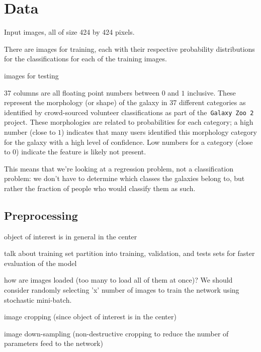 \section{Data}

Input images, all of size 424 by 424 pixels.

There are  images for training, each with their respective probability distributions for the classifications for each of the training images.

 images for testing

37 columns are all floating point numbers between $0$ and $1$ inclusive. These represent the morphology (or shape) of the galaxy in 37 different categories as identified by crowd-sourced volunteer classifications as part of the~\texttt{Galaxy Zoo 2} project. These morphologies are related to probabilities for each category; a high number (close to $1$) indicates that many users identified this morphology category for the galaxy with a high level of confidence. Low numbers for a category (close to $0$) indicate the feature is likely not present.

This means that we’re looking at a regression problem, not a classification problem: we don’t have to determine which classes the galaxies belong to, but rather the fraction of people who would classify them as such.


\subsection{Preprocessing}

object of interest is in general in the center

talk about training set partition into training, validation, and tests sets for faster evaluation of the model

how are images loaded (too many to load all of them at once)? We should consider randomly selecting 'x' number of images to train the network using stochastic mini-batch.

image cropping (since object of interest is in the center)

image down-sampling (non-destructive cropping to reduce the number of parameters feed to the network)

